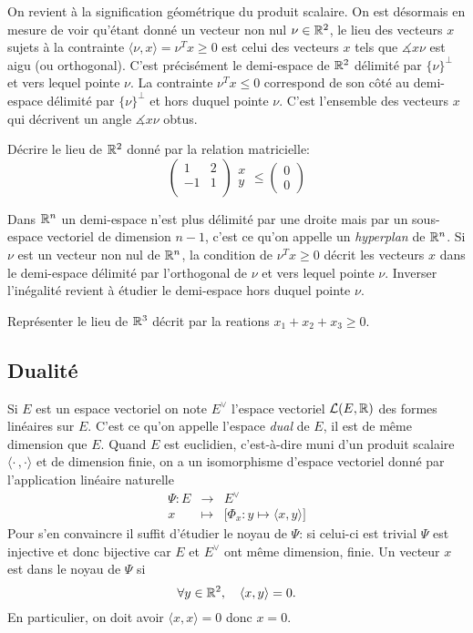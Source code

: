 \documentclass[11pt, a4paper]{article}
\begin{document}
On revient à la signification géométrique du produit scalaire. On est
désormais en mesure de voir qu'étant donné un vecteur non nul
$\nu \in \mathbb{R}^2$, le lieu des vecteurs $x$ sujets à la contrainte
$\langle \nu, x \rangle = \nu^Tx \geq 0$ est celui des vecteurs $x$
tels que $\measuredangle x\nu$ est aigu (ou orthogonal). C'est
précisément le demi-espace de $\mathbb{R}^2$ délimité par $\{\nu\}^\perp$ et
vers lequel pointe $\nu$. La contrainte $\nu^Tx \leq 0$ correspond de
son côté au demi-espace délimité par $\{\nu\}^{\perp}$ et hors duquel
pointe $\nu$. C'est l'ensemble des vecteurs $x$ qui décrivent un angle
$\measuredangle x\nu$ obtus.
\begin{question}
  \label{q:exmpdetravail}
  Décrire le lieu de $\mathbb{R}^2$ donné par la relation matricielle:
  \[
    \begin{pmatrix}
      1 & 2 \\
      -1 & 1 \\
    \end{pmatrix}
    \begin{matrix}
      x \\ y
    \end{matrix}
    \leq
    \begin{pmatrix}
      0 \\ 0
    \end{pmatrix}
  \]
\end{question}
Dans $\mathbb{R}^n$ un demi-espace n'est plus délimité par une droite
mais par un sous-espace vectoriel de dimension $n-1$, c'est ce qu'on
appelle un \emph{hyperplan} de $\mathbb{R}^n$. Si $\nu$ est un vecteur
non nul de $\mathbb{R}^n$, la condition de $\nu^Tx \geq 0$ décrit les
vecteurs $x$ dans le demi-espace délimité par l'orthogonal de $\nu$ et
vers lequel pointe $\nu$. Inverser l'inégalité revient à étudier le
demi-espace hors duquel pointe $\nu$.
\begin{question}
  Représenter le lieu de $\mathbb{R}^3$ décrit par la reations
  $x_1 + x_2 + x_3 \geq 0$.
\end{question}

\subsection{Dualité}

Si $E$ est un espace vectoriel on note $E^\vee$ l'espace vectoriel
$\mathcal{L}(E, \mathbb{R})$ des formes linéaires sur $E$. C'est ce
qu'on appelle l'espace \emph{dual} de $E$, il est de même dimension
que $E$. Quand $E$ est euclidien, c'est-à-dire muni d'un produit
scalaire $\langle \cdot\, , \cdot\rangle$ et de dimension finie, on a
un isomorphisme d'espace vectoriel donné par l'application linéaire
naturelle
\[
\begin{array}{rll}
\Psi : E & \longrightarrow & E^\vee \\
x & \longmapsto & \big[\Phi_x : y \longmapsto \langle x, y \rangle\big]
\end{array}
\]
Pour s'en convaincre il suffit d'étudier le noyau de $\Psi$: si
celui-ci est trivial $\Psi$ est injective et donc bijective car $E$ et
$E^\vee$ ont même dimension, finie. Un vecteur $x$ est dans le noyau
de $\Psi$ si
\[
\forall y \in \mathbb{R}^2, \quad \langle x, y\rangle = 0.
\]
En particulier, on doit avoir $\langle x, x\rangle = 0$ donc $x = 0$.
\end{document}
